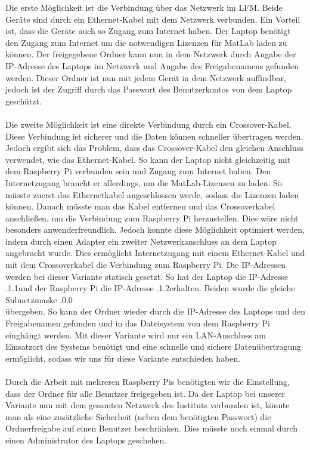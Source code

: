 \documentclass[12pt,a4paper,bibliography=totocnumbered,listof=totocnumbered]{scrartcl}
\begin{document}
 Die erste Möglichkeit ist die Verbindung über das Netzwerk im LFM. Beide Geräte sind durch ein Ethernet-Kabel mit dem Netzwerk verbunden. Ein Vorteil ist, dass die Geräte auch so Zugang zum Internet haben. Der Laptop benötigt den Zugang zum Internet um die notwendigen Lizenzen für MatLab laden zu können. Der freigegebene Ordner kann nun in dem Netzwerk durch Angabe der IP-Adresse des Laptops im Netzwerk und Angabe des Freigabenamens gefunden werden. Dieser Ordner ist nun mit jedem Gerät in dem Netzwerk auffindbar, jedoch ist der Zugriff durch das Passwort des Benutzerkontos von dem Laptop geschützt. \\ \\
Die zweite Möglichkeit ist eine direkte Verbindung durch ein Crossover-Kabel. Diese Verbindung ist sicherer und die Daten können schneller übertragen werden. Jedoch ergibt sich das Problem, dass das Crossover-Kabel den gleichen Anschluss verwendet, wie das Ethernet-Kabel. So kann der Laptop nicht gleichzeitig mit dem Raspberry Pi verbunden sein und Zugang zum Internet haben. Den Internetzugang braucht er allerdings, um die MatLab-Lizenzen zu laden. So müsste zuerst das Ethernetkabel angeschlossen werde, sodass die Lizenzen laden können. Danach müsste man das Kabel entfernen und das Crossoverkabel anschließen, um die Verbindung zum Raspberry Pi herzustellen. Dies wäre nicht besonders anwenderfreundlich. Jedoch konnte diese Möglichkeit optimiert werden, indem durch einen Adapter ein zweiter Netzwerkanschluss an dem Laptop angebracht wurde. Dies ermöglicht Internetzugang mit einem Ethernet-Kabel und mit dem Crossoverkabel die Verbindung zum Raspberry Pi. Die IP-Adressen werden bei dieser Variante statisch gesetzt. So hat der Laptop die IP-Adresse .1.1\grqq und der Raspberry Pi die IP-Adresse  .1.2\grqq erhalten. Beiden wurde die gleiche Subnetzmaske  .0.0\grqq \\ übergeben. So kann der Ordner wieder durch die IP-Adresse des Laptops und den Freigabenamen gefunden und in das Dateisystem von dem Raspberry Pi einghängt werden. Mit dieser Variante wird nur ein LAN-Anschluss am Einsatzort des Systems benötigt und eine schnelle und sichere Datenübertragung ermöglicht, sodass wir uns für diese Variante entschieden haben. \\ \\
Durch die Arbeit mit mehreren Raspberry Pis benötigten wir die Einstellung, dass der Ordner für alle Benutzer freigegeben ist. Da der Laptop bei unserer Variante nun mit dem gesamten Netzwerk des Instituts verbunden ist, könnte man als eine zusätzliche Sicherheit (neben dem benötigten Passwort) die Ordnerfreigabe auf einen Benutzer beschränken. Dies müsste noch einmal durch einen Administrator des Laptops geschehen. 
\end{document}
